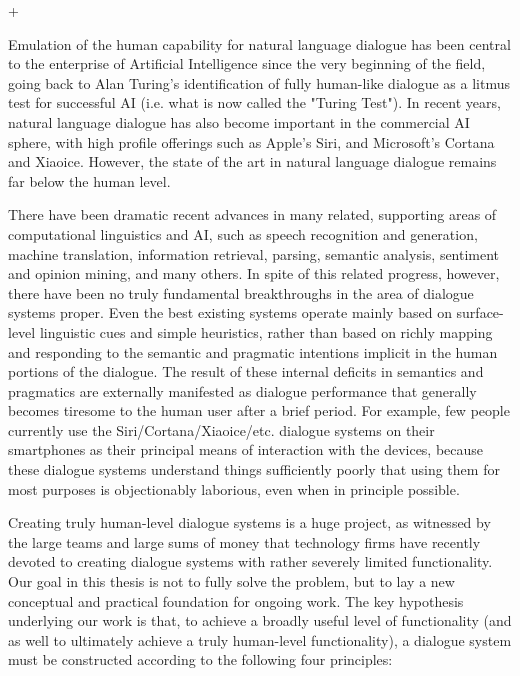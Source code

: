 +\begin{englishabstract}

Emulation of the human capability for natural language dialogue has been central to the enterprise of Artificial Intelligence since the very beginning of the field, going back to Alan Turing's identification of fully human-like dialogue as a litmus test for successful AI (i.e. what is now called the "Turing Test").  In recent years, natural language dialogue has also become important in the commercial AI sphere, with high profile offerings such as Apple's Siri, and Microsoft's Cortana and Xiaoice.  However, the state of the art in natural language dialogue remains far below the human level.  

There have been dramatic recent advances in many related, supporting areas of computational linguistics and AI, such as speech recognition and generation, machine translation, information retrieval, parsing, semantic analysis, sentiment and opinion mining, and many others.  In spite of this related progress, however, there have been no truly fundamental breakthroughs in the area of dialogue systems proper.  Even the best existing systems operate mainly based on surface-level linguistic cues and simple heuristics, rather than based on richly mapping and responding to the semantic and pragmatic intentions implicit in the human portions of the dialogue.  The result of these internal deficits in semantics and pragmatics are externally  manifested as dialogue performance that generally becomes tiresome to the human user after a brief period.  For example, few people currently use the Siri/Cortana/Xiaoice/etc. dialogue systems on their smartphones as their principal means of interaction with the devices, because these dialogue systems understand things sufficiently poorly that using them for most purposes is objectionably laborious, even when in principle possible.

Creating truly human-level dialogue systems is a huge project, as witnessed by the large teams and large sums of money that technology firms have recently devoted to creating dialogue systems with rather severely limited functionality.   Our goal in this thesis is not to fully solve the problem, but to lay a new conceptual and practical foundation for ongoing work.  The key hypothesis underlying our work is that, to achieve a broadly useful level of functionality (and as well to ultimately achieve a truly human-level functionality), a dialogue system must be constructed according to the following four principles:


\end{englishabstract}
